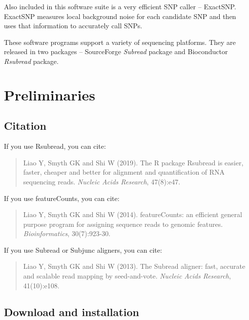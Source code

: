 \documentclass[12pt]{report}
\newcommand{\Subread}{\textsf{Subread}}
\newcommand{\Subjunc}{\textsf{Subjunc}}
\newcommand{\Rsubread}{\textsf{Rsubread}}
\newcommand{\ExactSNP}{\textsf{ExactSNP}}
\newcommand{\featureCounts}{\textsf{featureCounts}}
\begin{document}
Also included in this software suite is a very efficient SNP caller -- {\ExactSNP}.
{\ExactSNP} measures local background noise for each candidate SNP and then uses that information to accurately call SNPs.

These software programs support a variety of sequencing platforms. 
They are released in two packages -- SourceForge \emph{Subread} package and Bioconductor \emph{Rsubread} package\cite{Rsubread}.

\chapter{Preliminaries}

\section{Citation}

If you use {\Rsubread}, you can cite:

\begin{quote}
Liao Y, Smyth GK and Shi W (2019). 
The R package Rsubread is easier, faster, cheaper and better for alignment and quantification of RNA sequencing reads. 
\emph{Nucleic Acids Research}, 47(8):e47.
\\
{ }
\end{quote}

If you use \featureCounts, you can cite:

\begin{quote}
Liao Y, Smyth GK and Shi W (2014). 
featureCounts: an efficient general purpose program for assigning sequence reads to genomic features. 
\emph{Bioinformatics}, 30(7):923-30.
\\
{}
\end{quote}

If you use {\Subread} or {\Subjunc} aligners, you can cite:

\begin{quote}
Liao Y, Smyth GK and Shi W (2013). 
The Subread aligner: fast, accurate and scalable read mapping by seed-and-vote. 
\emph{Nucleic Acids Research}, 41(10):e108.
\\
{ }
\end{quote}

\newpage

\section{Download and installation}
\end{document}

